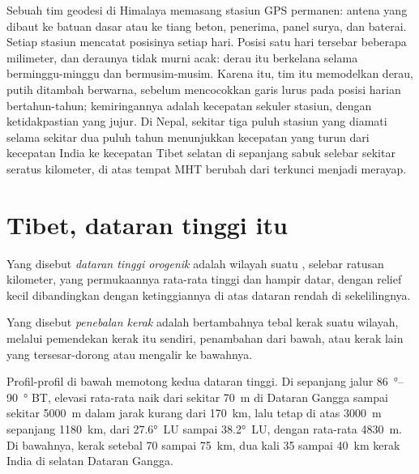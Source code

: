 \begin{inthefield}
Sebuah tim geodesi di Himalaya memasang stasiun GPS permanen: antena yang dibaut ke batuan dasar
atau ke tiang beton, penerima, panel surya, dan baterai. Setiap stasiun mencatat
posisinya setiap hari. Posisi satu hari tersebar beberapa milimeter, dan deraunya tidak murni
acak: derau itu berkelana selama berminggu-minggu dan bermusim-musim. Karena itu, tim itu memodelkan derau, putih ditambah
berwarna, sebelum mencocokkan garis lurus pada posisi harian bertahun-tahun; kemiringannya adalah
kecepatan sekuler stasiun, dengan ketidakpastian yang jujur. Di Nepal, sekitar tiga puluh stasiun
yang diamati selama sekitar dua puluh tahun menunjukkan kecepatan yang turun dari kecepatan India ke kecepatan Tibet selatan
di sepanjang sabuk selebar sekitar seratus kilometer, di atas tempat MHT berubah dari terkunci
menjadi merayap.
\end{inthefield}

\section{Tibet, dataran tinggi itu}\label{sec:b2:himalaya-andes:tibet}

\begin{definition}\label{def:b2:himalaya-andes:plateau}
Yang disebut \emph{dataran tinggi orogenik} adalah wilayah suatu , selebar ratusan
kilometer, yang permukaannya rata-rata tinggi dan hampir datar, dengan relief
kecil dibandingkan dengan ketinggiannya di atas dataran rendah di sekelilingnya.
\end{definition}

\begin{definition}\label{def:b2:himalaya-andes:thickening}
Yang disebut \emph{penebalan kerak} adalah bertambahnya tebal
kerak suatu wilayah, melalui pemendekan kerak itu sendiri, penambahan  dari bawah, atau
kerak lain yang tersesar-dorong atau mengalir ke bawahnya.
\end{definition}

Profil-profil di bawah memotong kedua dataran tinggi. Di sepanjang jalur \qtyrange{86}{90}{\degree} BT, elevasi
rata-rata naik dari sekitar \qty{70}{m} di Dataran Gangga sampai sekitar \qty{5000}{m} dalam jarak kurang
dari \qty{170}{km}, lalu tetap di atas \qty{3000}{m} sepanjang \qty{1180}{km}, dari \ang{27.6}~LU sampai
\ang{38.2}~LU, dengan rata-rata \qty{4830}{m}. Di bawahnya, kerak setebal 70 sampai \qty{75}{km},
dua kali 35 sampai \qty{40}{km} kerak India di selatan Dataran Gangga.

